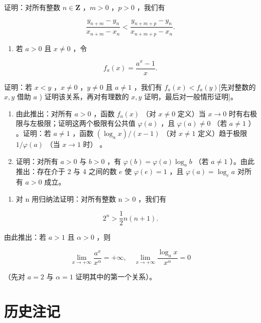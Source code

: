 证明：对所有整数 \(n \in \mathbf{Z}\) ，\(m > 0\) ，\(p > 0\) ，我们有

\[
\frac {y _ {n + m} - y _ {n}}{x _ {n + m} - x _ {n}} <   \frac {y _ {n + m + p} - y _ {n}}{x _ {n + m + p} - x _ {n}}.
\]

\begin{enumerate}
\def\labelenumi{\alph{enumi})}
\setcounter{enumi}{1}
\tightlist
\item
  若 \(a > 0\) 且 \(x \neq 0\) ，令
\end{enumerate}

\[
f _ {a} (x) = \frac {a ^ {x} - 1}{x}.
\]

证明：若 \(x < y\) ，\(x \neq 0\) ，\(y \neq 0\) 且 \(a \neq 1\) ，我们有 \(f_{a}(x) < f_{a}(y)\){[}先对整数的 \(x, y\) 借助 \(a\) ) 证明该关系，再对有理数的 \(x, y\) 证明，最后对一般情形证明{]}。

\begin{enumerate}
\def\labelenumi{\alph{enumi})}
\setcounter{enumi}{2}
\item
  由此推出：对所有 \(a > 0\) ，函数 \(f_{a}(x)\) （对 \(x \neq 0\) 定义）当 \(x \to 0\) 时有右极限与左极限；证明这两个极限有公共值 \(\varphi(a)\) ，且 \(\varphi(a) \neq 0\) （若 \(a \neq 1\) ） 。证明：若 \(a \neq 1\) ，函数 \((\log_{a} x) / (x - 1)\) （对 \(x \neq 1\) 定义）趋于极限 \(1 / \varphi(a)\) （当 \(x \to 1\) 时） 。
\item
  证明：对所有 \(a > 0\) 与 \(b > 0\) ，有 \(\varphi(b) = \varphi(a) \log_a b\) （若 \(a \neq 1\) ）。由此推出：存在介于 2 与 4 之间的数 \(e\) 使 \(\varphi(e) = 1\) ，且 \(\varphi(a) = \log_e a\) 对所有 \(a > 0\) 成立。
\end{enumerate}

\begin{enumerate}
\def\labelenumi{\arabic{enumi})}
\setcounter{enumi}{1}
\tightlist
\item
  对 n 用归纳法证明：对所有整数 n \textgreater{} 0 ，我们有
\end{enumerate}

\[
2 ^ {n} > \frac {1}{2} n (n + 1).
\]

由此推出：若 \(a > 1\) 且 \(\alpha > 0\) ，则

\[
\lim _ {x \rightarrow + \infty} \frac {a ^ {x}}{x ^ {\alpha}} = + \infty , \quad \lim _ {x \rightarrow + \infty} \frac {\log_ {a} x}{x ^ {\alpha}} = 0
\]

（先对 \(a = 2\) 与 \(\alpha = 1\) 证明其中的第一个关系）。

\section*{历史注记}
{}

